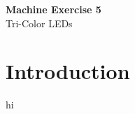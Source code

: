 \clearpage
\setcounter{page}{1}

\begin{center}
    \vspace*{3em}
    {\LARGE \textbf{Machine Exercise 5}}\\
    {\vspace{1.5em}}
    {\large Tri-Color LEDs}\\
\end{center}

\section{Introduction}
		hi